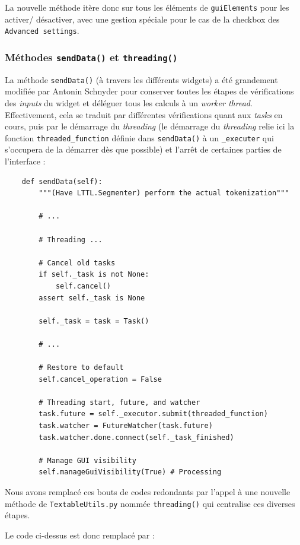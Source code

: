 \documentclass{article}
\begin{document}
La nouvelle méthode itère donc sur tous les éléments de \texttt{guiElements} pour les activer/ désactiver, avec une gestion spéciale pour le cas de la checkbox des \texttt{Advanced settings}.

\subsubsection{Méthodes \texttt{sendData()} et \texttt{threading()}}

La méthode \texttt{sendData()} (à travers les différents widgets) a été grandement modifiée par Antonin Schnyder pour conserver toutes les étapes de vérifications des \textit{inputs} du widget et déléguer tous les calculs à un \textit{worker thread}. Effectivement, cela se traduit par différentes vérifications quant aux \textit{tasks} en cours, puis par le démarrage du \textit{threading} (le démarrage du \textit{threading} relie ici la fonction \texttt{threaded\_function} définie dans \texttt{sendData()} à un \texttt{\_executer} qui s'occupera de la démarrer dès que possible) et l'arrêt de certaines parties de l'interface : 

\begin{verbatim}
    def sendData(self):
        """(Have LTTL.Segmenter) perform the actual tokenization"""

        # ...

        # Threading ...
        
        # Cancel old tasks
        if self._task is not None:
            self.cancel()
        assert self._task is None

        self._task = task = Task()
        
        # ...

        # Restore to default
        self.cancel_operation = False

        # Threading start, future, and watcher
        task.future = self._executor.submit(threaded_function)
        task.watcher = FutureWatcher(task.future)
        task.watcher.done.connect(self._task_finished)

        # Manage GUI visibility
        self.manageGuiVisibility(True) # Processing
\end{verbatim}

Nous avons remplacé ces bouts de codes redondants par l'appel à une nouvelle méthode de \texttt{TextableUtils.py} nommée \texttt{threading()} qui centralise ces diverses étapes.

Le code ci-dessus est donc remplacé par : 
\end{document}
